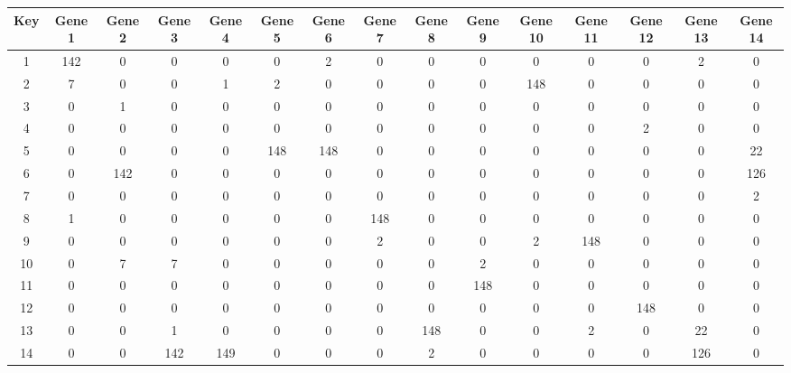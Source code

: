 \begin{tabular}{|c|c|c|c|c|c|c|c|c|c|c|c|c|c|c|}
\hline
Key & Gene 1 & Gene 2 & Gene 3 & Gene 4 & Gene 5 & Gene 6 & Gene 7 & Gene 8 & Gene 9 & Gene 10 & Gene 11 & Gene 12 & Gene 13 & Gene 14 \\
\hline
1 & 142 & 0 & 0 & 0 & 0 & 2 & 0 & 0 & 0 & 0 & 0 & 0 & 2 & 0 \\
2 & 7 & 0 & 0 & 1 & 2 & 0 & 0 & 0 & 0 & 148 & 0 & 0 & 0 & 0 \\
3 & 0 & 1 & 0 & 0 & 0 & 0 & 0 & 0 & 0 & 0 & 0 & 0 & 0 & 0 \\
4 & 0 & 0 & 0 & 0 & 0 & 0 & 0 & 0 & 0 & 0 & 0 & 2 & 0 & 0 \\
5 & 0 & 0 & 0 & 0 & 148 & 148 & 0 & 0 & 0 & 0 & 0 & 0 & 0 & 22 \\
6 & 0 & 142 & 0 & 0 & 0 & 0 & 0 & 0 & 0 & 0 & 0 & 0 & 0 & 126 \\
7 & 0 & 0 & 0 & 0 & 0 & 0 & 0 & 0 & 0 & 0 & 0 & 0 & 0 & 2 \\
8 & 1 & 0 & 0 & 0 & 0 & 0 & 148 & 0 & 0 & 0 & 0 & 0 & 0 & 0 \\
9 & 0 & 0 & 0 & 0 & 0 & 0 & 2 & 0 & 0 & 2 & 148 & 0 & 0 & 0 \\
10 & 0 & 7 & 7 & 0 & 0 & 0 & 0 & 0 & 2 & 0 & 0 & 0 & 0 & 0 \\
11 & 0 & 0 & 0 & 0 & 0 & 0 & 0 & 0 & 148 & 0 & 0 & 0 & 0 & 0 \\
12 & 0 & 0 & 0 & 0 & 0 & 0 & 0 & 0 & 0 & 0 & 0 & 148 & 0 & 0 \\
13 & 0 & 0 & 1 & 0 & 0 & 0 & 0 & 148 & 0 & 0 & 2 & 0 & 22 & 0 \\
14 & 0 & 0 & 142 & 149 & 0 & 0 & 0 & 2 & 0 & 0 & 0 & 0 & 126 & 0 \\
\hline
\end{tabular}